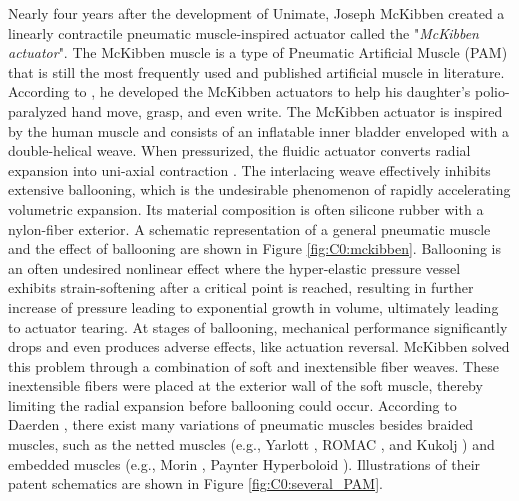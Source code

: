 Nearly four years after the development of Unimate, Joseph McKibben created a linearly contractile pneumatic muscle-inspired actuator called the "\emph{McKibben actuator}". The McKibben muscle is a type of Pneumatic Artificial Muscle (PAM) that is still the most frequently used and published artificial muscle in literature. According to \cite{Mckibben}, he developed the McKibben actuators to help his daughter's polio-paralyzed hand move, grasp, and even write. The McKibben actuator is inspired by the human muscle and consists of an inflatable inner bladder enveloped with a double-helical weave. When pressurized, the fluidic actuator converts radial expansion into uni-axial contraction \cite{Daerden1999,Daerden2000,Schulte1961}. The interlacing weave  effectively inhibits extensive ballooning, which is the undesirable phenomenon of rapidly accelerating volumetric expansion. Its material composition is often silicone rubber with a nylon-fiber exterior. A schematic representation of a general pneumatic muscle and the effect of ballooning are shown in Figure \ref{fig:C0:mckibben}. Ballooning is an often undesired nonlinear effect where the hyper-elastic pressure vessel exhibits strain-softening after a critical point is reached, resulting in further increase of pressure leading to exponential growth in volume, ultimately leading to actuator tearing. At stages of ballooning, mechanical performance significantly drops and even produces adverse effects, like actuation reversal. McKibben solved this problem through a combination of soft and inextensible fiber weaves. These inextensible fibers were placed at the exterior wall of the soft muscle, thereby limiting the radial expansion before ballooning could occur. According to Daerden \cite{Daerden1999}, there exist many variations of pneumatic muscles besides braided muscles, such as the netted muscles (e.g., Yarlott \cite{Yarlott1972}, ROMAC \cite{Immega1986}, and Kukolj \cite{Kukolj1988}) and embedded muscles (e.g., Morin \cite{Morin1953}, Paynter Hyperboloid \cite{Paynter1988}). Illustrations of their patent schematics are shown in Figure \ref{fig:C0:several_PAM}.

